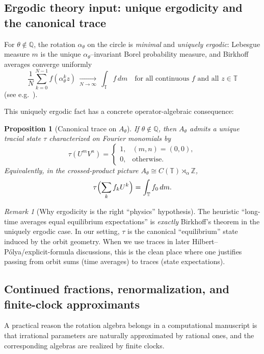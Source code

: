 \documentclass[11pt,oneside]{amsbook}
\numberwithin{equation}{section}
\theoremstyle{plain}
\newtheorem{proposition}[theorem]{Proposition}
\theoremstyle{definition}
\theoremstyle{remark}
\newtheorem{remark}[theorem]{Remark}
\newcommand{\Z}{\mathbb{Z}}
\newcommand{\Q}{\mathbb{Q}}
\begin{document}
\subsection{Ergodic theory input: unique ergodicity and the canonical trace}
For $\theta\notin\Q$, the rotation $\alpha_\theta$ on the circle is \emph{minimal} and \emph{uniquely ergodic}:
Lebesgue measure $m$ is the unique $\alpha_\theta$--invariant Borel probability measure, and Birkhoff averages converge uniformly
\[
\frac1N\sum_{k=0}^{N-1} f(\alpha_\theta^k z)\ \xrightarrow[N\to\infty]{}\ \int_{\mathbb{T}} f\,dm
\quad\text{for all continuous } f \text{ and all } z\in\mathbb{T}
\]
(see e.g.\ \cite{Walters1982ErgodicTheory}).

This uniquely ergodic fact has a concrete operator-algebraic consequence:

\begin{proposition}[Canonical trace on $A_\theta$]
\label{prop:trace_rotation_algebra}
If $\theta\notin\Q$, then $A_\theta$ admits a unique tracial state $\tau$ characterized on Fourier monomials by
\[
\tau(U^m V^n)=
\begin{cases}
1,& (m,n)=(0,0),\\
0,& \text{otherwise.}
\end{cases}
\]
Equivalently, in the crossed-product picture $A_\theta\cong C(\mathbb{T})\rtimes_\alpha\Z$,
\[
\tau\Bigl(\sum_{k} f_k U^k\Bigr)=\int_{\mathbb{T}} f_0\, dm .
\]
\end{proposition}

\begin{remark}[Why ergodicity is the right ``physics'' hypothesis]
The heuristic ``long-time averages equal equilibrium expectations'' is \emph{exactly} Birkhoff's theorem in the uniquely ergodic case.
In our setting, $\tau$ is the canonical ``equilibrium'' state induced by the orbit geometry.
When we use traces in later Hilbert--Pólya/explicit-formula discussions, this is the clean place where one justifies passing from orbit sums (time averages) to traces (state expectations).
\end{remark}


\subsection{Continued fractions, renormalization, and finite-clock approximants}
\label{sec:rotation_continued_fraction_rg}

A practical reason the rotation algebra belongs in a computational manuscript is that irrational parameters are naturally approximated by rational ones, and the corresponding algebras are realized by finite clocks.
\end{document}
